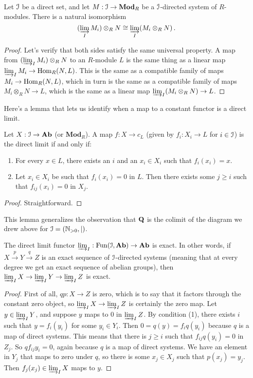\begin{prop}
Let $\mathcal I$ be a direct set, and let $M:\mathcal I\to\mathbf{Mod}_R$ be a $\mathcal I$-directed system of $R$-modules. There is a natural isomorphism 
\[
(\varinjlim_I M_i)\otimes_R N\cong \varinjlim_I (M_i\otimes_R N)\,.
\]
\end{prop}
\begin{proof}
Let's verify that both sides satisfy the same universal property. 
A map from $(\varinjlim_I M_i)\otimes_R N$ to an $R$-module $L$ is the same
thing as a linear map $\varinjlim_IM_i\to\operatorname{Hom}_R(N,L)$. This is the same as
a compatible family of maps $M_i\to\operatorname{Hom}_R(N,L)$, which in turn is the same
as a compatible family of maps $M_i\otimes_RN\to L$, which is the same as
a linear map $\varinjlim_I(M_i\otimes_RN)\to L$. 
\end{proof}

Here's a lemma that lets us identify when a map to a constant functor is a
direct limit.
\begin{lemma}
Let $X:\mathcal I\to\mathbf{Ab}$ (or $\mathbf{Mod}_R$). A map $f:X\to c_L$ (given
by $f_i:X_i\to L$ for $i\in\mathcal I$) is the direct limit if and only if:
\begin{enumerate}
\item For every $x\in L$, there exists an $i$ and an $x_i\in X_i$ such that $f_i(x_i)=x$.
\item Let $x_i\in X_i$ be such that $f_i(x_i)=0$ in $L$. Then there exists some $j\geq i$ such that $f_{ij}(x_i)=0$ in $X_j$.
\end{enumerate}
\end{lemma}
\begin{proof}
Straightforward.
\end{proof}
This lemma generalizes the observation that $\mathbf Q$ is the colimit of the diagram we drew above for $\mathcal I=(\mathbb N_{>0},|)$. 
\begin{prop}
The direct limit functor $\varinjlim_I:\operatorname{Fun}(\mathcal I,\mathbf{Ab})\to\mathbf{Ab}$ is exact. In other words, if $X\xrightarrow{p}Y\xrightarrow{q}Z$ is an exact sequence of $\mathcal I$-directed systems (meaning that at every degree we get an exact sequence of abelian groups), then $\varinjlim_IX\rightarrow \varinjlim_IY\rightarrow\varinjlim_IZ$ is exact.
\end{prop}
\begin{proof}
First of all, $qp:X\to Z$ is zero, which is to say that it factors through the constant zero object, so $\varinjlim_IX\to \varinjlim_I Z$ is certainly the zero map. Let $y\in \varinjlim_IY$, and suppose $y$ maps to $0$ in $\varinjlim_IZ$. By condition (1), there exists $i$ such that $y=f_i(y_i)$ for some $y_i\in Y_i$. Then $0=q(y)=f_iq(y_i)$ because $q$ is a map of direct systems. This means that there is $j\geq i$ such that $f_{ij}q(y_i)=0$ in $Z_j$. So $qf_{ij}y_i=0$,
again because $q$ is a map of direct systems. We have an element in $Y_j$ that maps to zero under $q$, so there is some $x_j\in X_j$ such that $p(x_j)=y_j$.
Then $f_j(x_j)\in \varinjlim_IX$ maps to $y$.
\end{proof}

